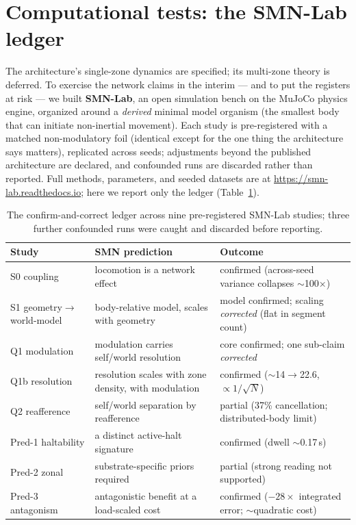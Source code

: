 \documentclass[utf8]{FrontiersinHarvard}
\begin{document}
\section{Computational tests: the SMN-Lab ledger}\label{sec:ledger}

The architecture's single-zone dynamics are specified; its multi-zone theory is deferred. To exercise the network claims in the interim --- and to put the registers at risk --- we built \textbf{SMN-Lab}, an open simulation bench on the MuJoCo physics engine, organized around a \emph{derived} minimal model organism (the smallest body that can initiate non-inertial movement). Each study is pre-registered with a matched non-modulatory foil (identical except for the one thing the architecture says matters), replicated across seeds; adjustments beyond the published architecture are declared, and confounded runs are discarded rather than reported. Full methods, parameters, and seeded datasets are at \url{https://smn-lab.readthedocs.io}; here we report only the ledger (Table~\ref{tab:ledger}).

\begin{table}[ht]
\centering
\caption{The confirm-and-correct ledger across nine pre-registered SMN-Lab studies; three further confounded runs were caught and discarded before reporting.}
\label{tab:ledger}
\begin{tabular}{p{3.1cm} p{5.1cm} p{5.1cm}}
\toprule
\textbf{Study} & \textbf{SMN prediction} & \textbf{Outcome} \\
\midrule
S0 coupling & locomotion is a network effect & confirmed (across-seed variance collapses $\sim$100$\times$) \\
S1 geometry$\to$world-model & body-relative model, scales with geometry & model confirmed; scaling \emph{corrected} (flat in segment count) \\
Q1 modulation & modulation carries self/world resolution & core confirmed; one sub-claim \emph{corrected} \\
Q1b resolution & resolution scales with zone density, with modulation & confirmed ($\sim$14$\to$22.6, $\propto 1/\sqrt N$) \\
Q2 reafference & self/world separation by reafference & partial (37\% cancellation; distributed-body limit) \\
Pred-1 haltability & a distinct active-halt signature & confirmed (dwell $\sim$0.17\,s) \\
Pred-2 zonal & substrate-specific priors required & partial (strong reading not supported) \\
Pred-3 antagonism & antagonistic benefit at a load-scaled cost & confirmed ($-28\times$ integrated error; $\sim$quadratic cost) \\
\bottomrule
\end{tabular}
\end{table}
\end{document}
